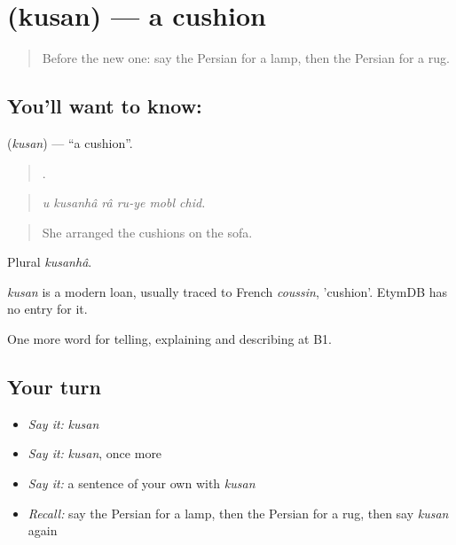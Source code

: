 \section[\texorpdfstring{\fa{کوسن} (kusan)}{کوسن (kusan)}]{ (kusan) — a cushion}

\label{lesson:FA-C534-kusan}



\begin{quote}
Before the new one: say the Persian for a lamp, then the Persian for a rug.
\end{quote}

\subsection*{You'll want to know: }
\textbf{} (\emph{kusan}) — \textquotedblleft{}a cushion\textquotedblright{}.

\begin{quote}
     .
\end{quote}

\begin{quote}
\emph{u kusanhâ râ ru-ye mobl chid.}
\end{quote}

\begin{quote}
She arranged the cushions on the sofa.
\end{quote}

Plural \emph{kusanhâ}.

\begin{cousinweb}
\emph{kusan} is a modern loan, usually traced to French \emph{coussin}, 'cushion'. EtymDB has no entry for it.
\end{cousinweb}

\begin{grammarlens}[title={What you've built}]
One more word for telling, explaining and describing at B1.
\end{grammarlens}

\subsection*{Your turn}
\begin{itemize}
\raggedright
  \item \emph{Say it:} \emph{kusan}
  \item \emph{Say it:} \emph{kusan}, once more
  \item \emph{Say it:} a sentence of your own with \emph{kusan}
  \item \emph{Recall:} say the Persian for a lamp, then the Persian for a rug, then say \emph{kusan} again
\end{itemize}

